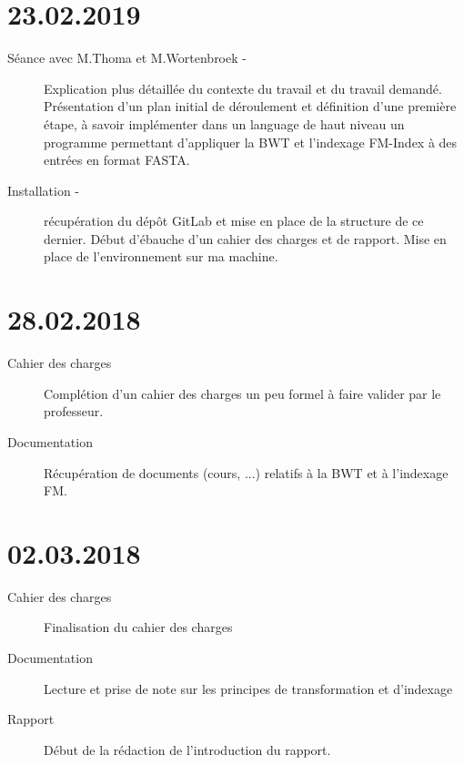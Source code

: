 

\label{journal} %


\section*{23.02.2019}

\begin{description}
	\item [Séance avec M.Thoma et M.Wortenbroek -] Explication plus détaillée du contexte du travail et du travail demandé. Présentation d'un plan initial de déroulement et définition d'une première étape, à savoir implémenter dans un language de haut niveau un programme permettant d'appliquer la \textrm{BWT} et l'indexage \textrm{FM-Index} à des entrées en format \textrm{FASTA}.
	\item [Installation -] récupération du dépôt \textrm{GitLab} et mise en place de la structure de ce dernier. Début d'ébauche d'un cahier des charges et de rapport. Mise en place de l'environnement sur ma machine.
\end{description}

\section*{28.02.2018}

\begin{description}
	\item [Cahier des charges] Complétion d'un cahier des charges un peu formel à faire valider par le professeur.
	\item [Documentation] Récupération de documents (cours, ...) relatifs à la BWT et à l'indexage FM.
	
\end{description}

\section*{02.03.2018}

\begin{description}
	\item [Cahier des charges] Finalisation du cahier des charges
	\item [Documentation] Lecture et prise de note sur les principes de transformation et d'indexage
	\item [Rapport] Début de la rédaction de l'introduction du rapport.
	
\end{description}

